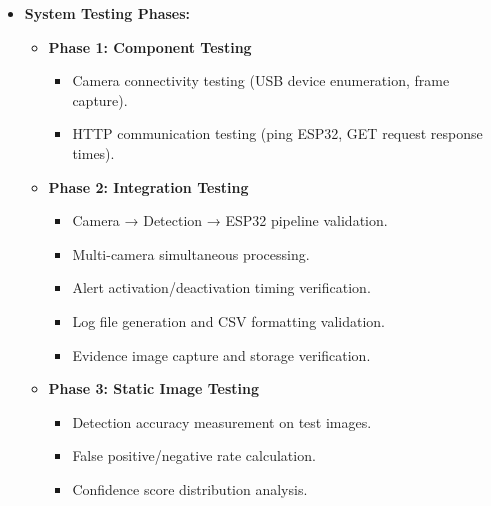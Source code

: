 \documentclass[a4paper, 12pt]{report}
\begin{document}
\begin{enumerate}[itemsep=-4pt, label=\textbf{\roman*.}]
\begin{itemize}[itemsep=-4pt]
        \item \textbf{System Testing Phases:}
        \vspace{-4pt}
        \begin{itemize}
            \item \textbf{Phase 1: Component Testing}
            \vspace{-4pt}
            \begin{itemize}
                
                \item Camera connectivity testing (USB device enumeration, frame capture).
                \item HTTP communication testing (ping ESP32, GET request response times).
            \end{itemize}

            \item \textbf{Phase 2: Integration Testing}
            \vspace{-4pt}
            \begin{itemize}
                \item Camera → Detection → ESP32 pipeline validation.
                \item Multi-camera simultaneous processing.
                \item Alert activation/deactivation timing verification.
                \item Log file generation and CSV formatting validation.
                \item Evidence image capture and storage verification.
            \end{itemize}

            \item \textbf{Phase 3: Static Image Testing}
            \vspace{-4pt}
            \begin{itemize}
                \item Detection accuracy measurement on test images.
                \item False positive/negative rate calculation.
                \item Confidence score distribution analysis.
            \end{itemize}


\end{itemize}
\end{itemize}
\end{enumerate}
\end{document}
